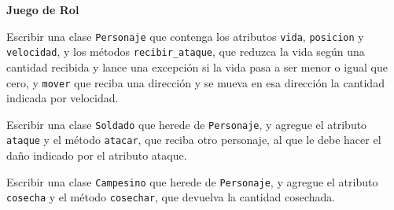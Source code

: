 \begin{ejercicio}
{\bf Juego de Rol}
\begin{partes}
    \item Escribir una clase \verb|Personaje| que contenga los atributos
\verb|vida|, \verb|posicion| y \verb|velocidad|, y los métodos
\verb|recibir_ataque|, que reduzca la vida según una cantidad recibida y lance
una excepción si la vida pasa a ser menor o igual que cero, y
\verb|mover| que reciba una dirección y se mueva en esa dirección la cantidad
indicada por velocidad.
    \item Escribir una clase \verb|Soldado| que herede de \verb|Personaje|, y agregue
el atributo \verb|ataque| y el método \verb|atacar|, que reciba otro
personaje, al que le debe hacer el daño indicado por el atributo ataque.
    \item Escribir una clase \verb|Campesino| que herede de \verb|Personaje|, y agregue
el atributo \verb|cosecha| y el método \verb|cosechar|, que devuelva la
cantidad cosechada.
\end{partes}
\end{ejercicio}

